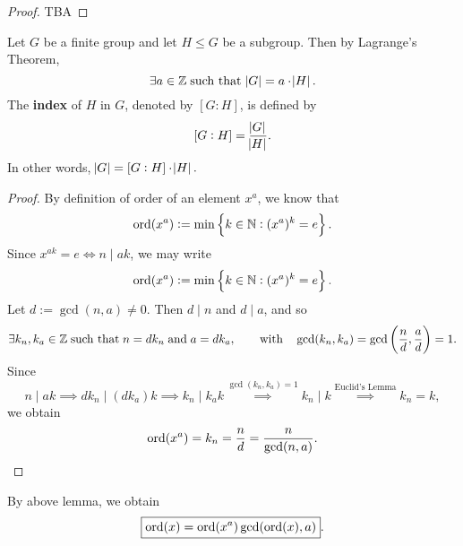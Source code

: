 \documentclass[11pt,openany]{article}
\begin{document}
\newpage
{}
\begin{proof}
TBA
\end{proof}
\begin{remark*}
	Let $G$ be a finite group and let $H\leq G$ be a subgroup. Then by Lagrange's Theorem, \[
	\exists a\in \mathbb{Z}\;\text{such that}\; \abs{G}= a\cdot\abs{H}.
	\]The \textbf{index} of $H$ in $G$, denoted by $[G:H]$, is defined by \[
	[G:H]=\frac{\abs{G}}{\abs{H}}.
	\] In other words, $\abs{G}=[G:H]\cdot\abs{H}.$
\end{remark*}


\begin{proof}
	By definition of order of an element $x^a$, we know that \[
	\operatorname*{ord}(x^a):=\min\set{k\in\mathbb{N}:(x^a)^k=e}.
	\] Since $x^{ak}=e\iff n\mid ak$, we may write \[
	\operatorname*{ord}(x^a):=\min\set{k\in\mathbb{N}:(x^a)^k=e}.
	\] Let $d:=\gcd(n,a)\neq 0$. Then $d\mid n$ and $d\mid a$, and so \[
	\exists k_n, k_a\in\mathbb{Z}\; \text{such that}\; n=dk_n\; \text{and}\; a=dk_a,\quad\quad\text{with}\quad \gcd(k_n,k_a)=\gcd\left(\frac{n}{d},\frac{a}{d}\right)=1.
	\] Since \[
	n\mid ak\implies dk_n\mid (dk_a)k\implies k_n\mid k_ak\overset{\gcd(k_n,k_a)=1}{\implies} k_n\mid k\overset{\text{Euclid's Lemma}}{\implies} k_n=k,
	\] we obtain \[
	\operatorname*{ord}(x^a)=k_n=\frac{n}{d}=\frac{n}{\gcd(n,a)}.
	\]
\end{proof}
\begin{remark*}
	By above lemma, we obtain \[
	\boxed{\operatorname*{ord}(x)=\operatorname*{ord}(x^a)\gcd(\operatorname*{ord}(x),a)}.
	\]
\end{remark*}
\end{document}
